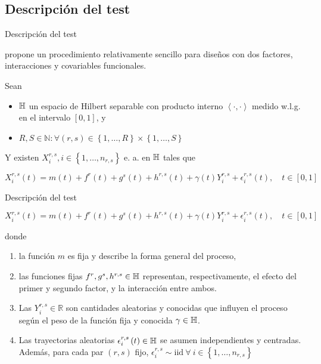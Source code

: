 \documentclass[10pt,spanish]{beamer}\usepackage[]{graphicx}\usepackage[]{color}
\begin{document}
\subsection{Descripción del test}
\begin{frame}{Descripción del test}

\cite{Cuesta 2010} propone un procedimiento relativamente sencillo
para diseños con dos factores, interacciones y covariables funcionales.

\pause{}

Sean
\begin{itemize}
\item $\mathbb{H}$ un espacio de Hilbert separable con producto interno $\left\langle \cdot,\cdot\right\rangle $
medido w.l.g. en el intervalo $\left[0,1\right]$, y
\item $R,S\in\mathbb{N}:\forall\left(r,s\right)\in\left\{ 1,\dots,R\right\} \times\left\{ 1,\dots,S\right\} $ 
\end{itemize}

\pause{}

Y existen $X_{i}^{r,s},i\in\left\{ 1,\dots,n_{r,s}\right\} $ e. a.
en $\mathbb{H}$ tales que

\vspace{-15pt}

\[
X_{i}^{r,s}\left(t\right)=m\left(t\right)+f^{r}\left(t\right)+g^{s}\left(t\right)+h^{r,s}\left(t\right)+\gamma\left(t\right)Y_{i}^{r,s}+\epsilon_{i}^{r,s}\left(t\right),\quad t\in\left[0,1\right]
\]

\end{frame}
%
\begin{frame}{Descripción del test}

\[
X_{i}^{r,s}\left(t\right)=m\left(t\right)+f^{r}\left(t\right)+g^{s}\left(t\right)+h^{r,s}\left(t\right)+\gamma\left(t\right)Y_{i}^{r,s}+\epsilon_{i}^{r,s}\left(t\right),\quad t\in\left[0,1\right]
\]


\pause{}

donde
\begin{enumerate}[<+->]
\item la función $m$ es fija y describe la forma general del proceso,
\item las funciones fijas $f^{r},g^{s},h^{r,s}\in\mathbb{H}$ representan, respectivamente,
el efecto del primer y segundo factor, y la interacción entre ambos.
\item Las $Y_{i}^{r,s}\in\mathbb{R}$ son cantidades aleatorias y conocidas
que influyen el proceso según el peso de la función fija y conocida
$\gamma\in\mathbb{H}$.
\item Las trayectorias aleatorias $\epsilon_{i}^{r,s}\left(t\right)\in\mathbb{H}$
se asumen independientes y centradas. Además, para cada par $\left(r,s\right)$
fijo, $\epsilon_{i}^{r,s}\sim\text{iid}\ \forall\ i\in\left\{ 1,\dots,n_{r,s}\right\} $
\end{enumerate}
\end{frame}
\end{document}
